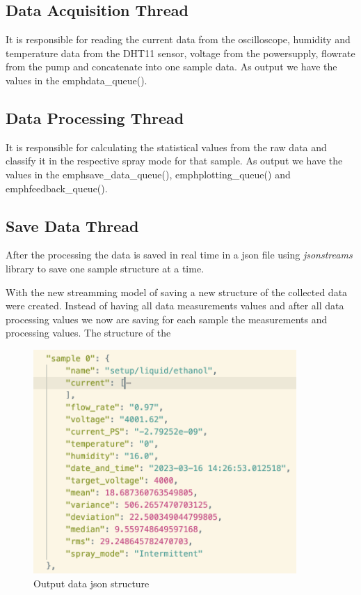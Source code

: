     \subsection{Data Acquisition Thread}
    \label{subsec:data_aquisition}

        It is responsible for reading the current data from the oscilloscope, humidity and temperature data from the DHT11 sensor, voltage from the powersupply, flowrate from the pump and concatenate into one sample data.
        As output we have the values in the emph{data\_queue()}.

    \subsection{Data Processing Thread}

        It is responsible for calculating the statistical values from the raw data and classify it in the respective spray mode for that sample.
        As output we have the values in the emph{save\_data\_queue()}, emph{plotting\_queue()} and emph{feedback\_queue()}.
    
        \subsection{Save Data Thread}

        After the processing the data is saved in real time in a json file using \emph{jsonstreams} library to save one sample structure at a time.

        With the new streamming model of saving a new structure of the collected data were created.
        Instead of having all data measurements values and after all data processing values we now are saving for each sample the measurements and processing values.
        The structure of the 
    
        \begin{figure}[H]
            \center
            \includegraphics[width=10cm]{Figuras/19:03/new_sample.png}
            \caption{Output data json structure}
        \end{figure}
    
